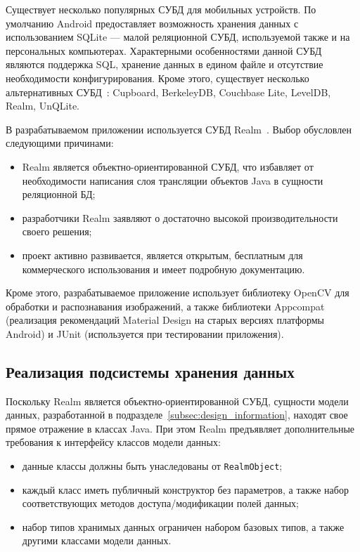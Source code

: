 Существует несколько популярных СУБД для мобильных устройств.
По умолчанию Android предоставляет возможность хранения
данных с использованием SQLite --- малой реляционной СУБД,
используемой также и на персональных компьютерах.
Характерными особенностями данной СУБД являются поддержка SQL,
хранение данных в едином файле и отсутствие необходимости конфигурирования.
Кроме этого, существует несколько альтернативных СУБД~\cite{mobile_db}:
Cupboard, BerkeleyDB, Couchbase Lite, LevelDB, Realm, UnQLite.

В разрабатываемом приложении используется СУБД Realm~\cite{realm_official}.
Выбор обусловлен следующими причинами:
\begin{itemize}
  \item Realm является объектно-ориентированной СУБД,
    что избавляет от необходимости написания слоя трансляции объектов Java
    в сущности реляционной БД;
  \item разработчики Realm заявляют о достаточно высокой производительности
    своего решения;
  \item проект активно развивается, является открытым,
    бесплатным для коммерческого использования
    и имеет подробную документацию.
\end{itemize}

Кроме этого, разрабатываемое приложение использует библиотеку OpenCV
для обработки и распознавания изображений, а также библиотеки Appcompat
(реализация рекомендаций Material Design на старых версиях платформы Android)
и JUnit (используется при тестировании приложения).

\subsection{Реализация подсистемы хранения данных}
\label{subsec:implementation_db}

Поскольку Realm является объектно-ориентированной СУБД,
сущности модели данных, разработанной в подразделе~\ref{subsec:design_information},
находят свое прямое отражение в классах Java.
При этом Realm предъявляет дополнительные требования
к интерфейсу классов модели данных:
\begin{itemize}
  \item данные классы должны быть унаследованы от \texttt{RealmObject};
  \item каждый класс иметь публичный конструктор без параметров,
    а также набор соответствующих методов доступа/модификации полей данных;
  \item набор типов хранимых данных ограничен набором базовых типов,
    а также другими классами модели данных.
\end{itemize}

